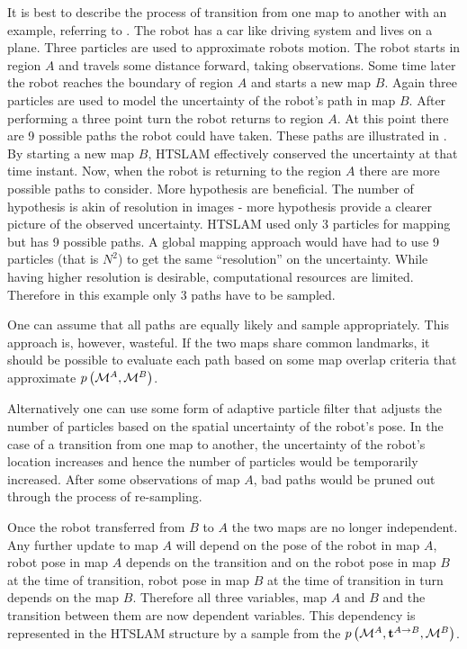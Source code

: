 It is best to describe the process of transition from one map to
another with an example, referring to
. The robot has a car like driving
system and lives on a plane. Three particles are used to approximate
robots motion. The robot starts in region $A$ and travels some
distance forward, taking observations. Some time later the robot
reaches the boundary of region $A$ and starts a new map $B$. Again
three particles are used to model the uncertainty of the robot's path
in map $B$. After performing a three point turn the robot returns to
region $A$. At this point there are 9 possible paths the robot could
have taken. These paths are illustrated in
. By starting a new map $B$, HTSLAM
effectively conserved the uncertainty at that time instant. Now, when
the robot is returning to the region $A$ there are more possible paths
to consider. More hypothesis are beneficial. The number of hypothesis
is akin of resolution in images - more hypothesis provide a clearer
picture of the observed uncertainty. HTSLAM used only 3 particles for
mapping but has 9 possible paths. A global mapping approach would have
had to use 9 particles (that is $N^2$) to get the same ``resolution''
on the uncertainty. While having higher resolution is desirable,
computational resources are limited. Therefore in this example only 3
paths have to be sampled.

One can assume that all paths are equally likely and sample
appropriately. This approach is, however, wasteful. If the two maps
share common landmarks, it should be possible to evaluate each path
based on some map overlap criteria that approximate
$\prob{\mapA,\mapB}$.

Alternatively one can use some form of adaptive particle filter
\cite{KLDSampling} that adjusts the number of particles
based on the spatial uncertainty of the robot's pose. In the case of a
transition from one map to another, the uncertainty of the robot's
location increases and hence the number of particles would be
temporarily increased. After some observations of map $A$, bad paths
would be pruned out through the process of re-sampling. 


Once the robot transferred from $B$ to $A$ the two maps are no longer
independent. Any further update to map $A$ will depend on the pose of
the robot in map $A$, robot pose in map $A$ depends on the transition
and on the robot pose in map $B$ at the time of transition, robot pose
in map $B$ at the time of transition in turn depends on the map
$B$. Therefore all three variables, map $A$ and $B$ and the transition
between them are now dependent variables. This dependency is
represented in the HTSLAM structure by a sample from the
$\prob{\mapA,\tr{}{A}{B},\mapB}$.

